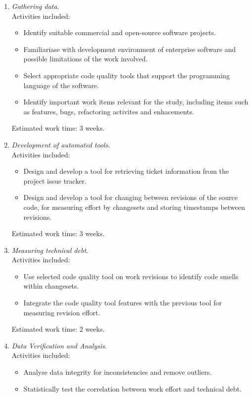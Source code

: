 \documentclass{mprop}
\begin{document}
\begin{enumerate}
	\item \textit{Gathering data}.\\
	Activities included:
	\begin{itemize}
		\item Identify suitable commercial and open-source software projects.
		\item Familiariase with development environment of enterprise software
		and possible limitations of the work involved.
		\item Select appropriate code quality tools that support the programming
		language of the software.
		\item Identify important work items relevant for the study, including
		items such as features, bugs, refactoring activites and enhacements.
	\end{itemize}

	Estimated work time: 3 weeks.\\
	
	\item \textit{Development of automated tools}.\\
	Activities included:
	\begin{itemize}
		\item Design and develop a tool for retrieving ticket information from
		the project issue tracker.
		\item Design and develop a tool for changing between revisions of the
		source code, for measuring effort by changesets and storing timestamps
		between revisions.
	\end{itemize}

	Estimated work time: 3 weeks.\\

	\item \textit{Measuring technical debt}.\\
	Activities included:
	\begin{itemize}
		\item Use selected code quality tool on work revisions to identify code
		smells within changesets.
		\item Integrate the code quality tool features with the previous tool
		for measuring revision effort.
	\end{itemize}

	Estimated work time: 2 weeks.\\

	\item \textit{Data Verification and Analysis}.\\
	Activities included:
	\begin{itemize}
		\item Analyse data integrity for inconsistencies and remove outliers.
		\item Statistically test the correlation between work effort and technical debt.
	\end{itemize}


\end{enumerate}
\end{document}
